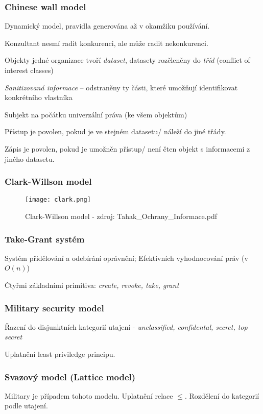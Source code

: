 \documentclass[10pt,a4paper]{article}
\begin{document}
\subsubsection*{Chinese wall model}
Dynamický model, pravidla generována až v okamžiku používání.

Konzultant nesmí radit konkurenci, ale může radit nekonkurenci.

Objekty jedné organizace tvoří \textit{dataset}, datasety rozčleněny do \textit{tříd} (conflict of interest classes)

\textit{Sanitizovaná informace} – odstraněny ty části, které umožňují identifikovat konkrétního vlastníka

Subjekt na počátku univerzální práva (ke všem objektům)

Přístup je povolen, pokud je ve stejném datasetu/ náleží do jiné třády.

Zápis je povolen, pokud je umožněn přístup/ není čten objekt s informacemi z jiného datasetu.
\subsubsection*{Clark-Willson model}
\begin{figure}[ht]
    \texttt{[image: clark.png]}
    \caption{Clark-Willson model - zdroj: Tahak\_Ochrany\_Informace.pdf}
    \label{normal_case}
\end{figure}

\subsubsection*{Take-Grant systém}
Systém přidělování a odebírání oprávnění; Efektivních vyhodnocování práv (v $O(n)$)

Čtyřmi základními primitiva: \textit{create, revoke, take, grant}

\subsubsection*{Military security model}
Řazení do disjunktních kategorií utajení - \textit{unclassified, confidental, secret, top secret}

Uplatnění least priviledge principu.

\subsubsection*{Svazový model (Lattice model)}
Military je případem tohoto modelu. Uplatnění relace $\leq$. Rozdělení do kategorií podle utajení.
\newpage
\end{document}
